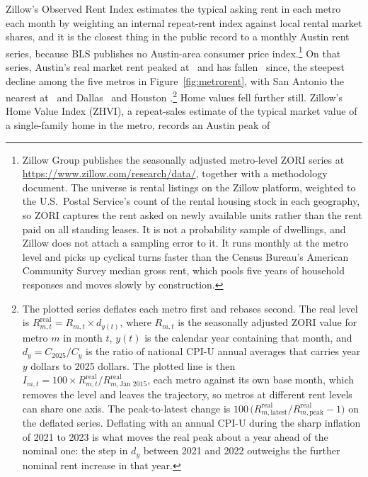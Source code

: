 Zillow's Observed Rent Index estimates the typical asking rent in each metro
each month by weighting an internal repeat-rent index against local rental
market shares, and it is the closest thing in the public record to a monthly
Austin rent series, because BLS publishes no Austin-area consumer price
index.\footnote{Zillow Group publishes the seasonally adjusted metro-level
ZORI series at \url{https://www.zillow.com/research/data/}, together with a
methodology document. The universe is rental listings on the Zillow platform,
weighted to the U.S.\ Postal Service's count of the rental housing stock in
each geography, so ZORI captures the rent asked on newly available units
rather than the rent paid on all standing leases. It is not a probability
sample of dwellings, and Zillow does not attach a sampling error to it. It
runs monthly at the metro level and picks up cyclical turns faster than the
Census Bureau's American Community Survey median gross rent, which pools five
years of household responses and moves slowly by construction.} On that
series, Austin's real market rent peaked at \NColZoriAustinPeak\ and has
fallen \NColZoriAustinPeaktolatest\ since, the steepest decline among the five
metros in Figure~\ref{fig:metrorent}, with San Antonio the nearest at
\NColZoriSanantonioPeaktolatest\ and Dallas
\NColZoriDallasPeaktolatest\ and Houston
\NColZoriHoustonPeaktolatest.\footnote{The plotted series deflates each metro
first and rebases second. The real level is
\(R^{\mathrm{real}}_{m,t} = R_{m,t} \times d_{y(t)}\), where \(R_{m,t}\) is
the seasonally adjusted ZORI value for metro \(m\) in month \(t\), \(y(t)\)
is the calendar year containing that month, and \(d_y = C_{2025}/C_y\) is
the ratio of national CPI-U annual averages that carries year \(y\) dollars
to 2025 dollars. The plotted line is then
\(I_{m,t} = 100 \times R^{\mathrm{real}}_{m,t} \big/
   R^{\mathrm{real}}_{m,\text{Jan }2015}\),
each metro against its own base month, which removes the level and leaves the
trajectory, so metros at different rent levels can share one axis. The
peak-to-latest change is
\(100\,\bigl(R^{\mathrm{real}}_{m,\text{latest}} \big/
   R^{\mathrm{real}}_{m,\text{peak}} - 1\bigr)\)
on the deflated series. Deflating with an annual CPI-U during the sharp
inflation of 2021 to 2023 is what moves the real peak about a year ahead of
the nominal one: the step in \(d_y\) between 2021 and 2022 outweighs the
further nominal rent increase in that year.} Home values fell further still.
Zillow's Home Value Index (ZHVI), a repeat-sales estimate of the typical
market value of a single-family home in the metro, records an Austin peak of
